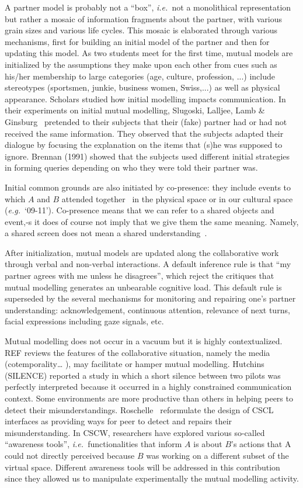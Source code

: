 \documentclass[twocolumn]{article}
\newcommand{\ie}{{\textit{i.e.\ }}}
\newcommand{\eg}{{\textit{e.g.\ }}}
\begin{document}
A partner model is probably not a ``box'', \ie not a monolithical representation
but rather a mosaic of information fragments about the partner, with various
grain sizes and various life cycles. This mosaic is elaborated through various
mechanisms, first for building an initial model of the partner and then for
updating this model.  As two students meet for the first time, mutual models are
initialized by the assumptions they make upon each other from cues such as
his/her membership to large categories (age, culture, profession, ...) include
stereotypes (sportsmen, junkie, business women, Swiss,...) as well as physical
appearance. Scholars studied how initial modelling impacts communication. In
their experiments on initial mutual modelling, Slugoski, Lalljee, Lamb \&
Ginsburg~\citep{slugoski1993attribution} pretended to their subjects that their
(fake) partner had or had not received the same information. They observed that
the subjects adapted their dialogue by focusing the explanation on the items
that (s)he was supposed to ignore. Brennan (1991)  showed that the subjects used
different initial strategies in forming queries depending on who they were told
their partner was.  

Initial common grounds are also initiated by co-presence: they include events to
which $A$ and $B$ attended together~\citep{clark2002definite} in the physical space
or in our cultural space (\eg ‘09-11'). Co-presence means that we can refer to
a shared objects and event,-s it does of course not imply that we give them the
same meaning. Namely, a shared screen does not mean a shared
understanding~\citep{dillenbourg2006sharing}.

After initialization, mutual models are updated along the collaborative work
through verbal and non-verbal interactions. A default inference rule is that ``my
partner agrees with me unless he disagrees'', which reject the critiques that
mutual modelling generates an unbearable cognitive load. This default rule is
superseded by the several mechanisms for monitoring and repairing one's partner
understanding: acknowledgement, continuous attention, relevance of next turns,
facial expressions including gaze signals, etc.

Mutual modelling does not occur in a vacuum but it is highly contextualized. REF
reviews the features of the collaborative situation, namely the media
(cotemporality… ), may facilitate or hamper mutual modelling. Hutchins (SILENCE)
reported a study in which a short silence between two pilots was perfectly
interpreted because it occurred in a highly constrained communication context.
Some environments are more productive than others in helping peers to detect
their misunderstandings. Roschelle~\citep{roschelle1995construction} reformulate
the design of CSCL interfaces as providing ways for peer to detect and repairs
their misunderstanding. In CSCW, researchers have explored various so-called
``awareness tools'', \ie functionalities that inform $A$ is about $B$'s actions that A
could not directly perceived because $B$ was working on a different subset of the
virtual space. Different awareness tools will be addressed in this contribution
since they allowed us to manipulate experimentally the mutual modelling activity. 
\end{document}
